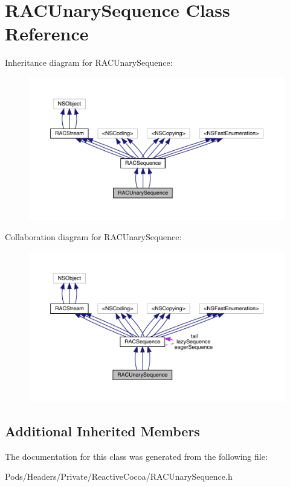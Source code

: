 \hypertarget{interface_r_a_c_unary_sequence}{}\section{R\+A\+C\+Unary\+Sequence Class Reference}
\label{interface_r_a_c_unary_sequence}


Inheritance diagram for R\+A\+C\+Unary\+Sequence\+:\nopagebreak
\begin{figure}[H]
\begin{center}
\leavevmode
\includegraphics[width=350pt]{interface_r_a_c_unary_sequence__inherit__graph}
\end{center}
\end{figure}


Collaboration diagram for R\+A\+C\+Unary\+Sequence\+:\nopagebreak
\begin{figure}[H]
\begin{center}
\leavevmode
\includegraphics[width=350pt]{interface_r_a_c_unary_sequence__coll__graph}
\end{center}
\end{figure}
\subsection*{Additional Inherited Members}


The documentation for this class was generated from the following file\+:\begin{DoxyCompactItemize}
\item 
Pods/\+Headers/\+Private/\+Reactive\+Cocoa/R\+A\+C\+Unary\+Sequence.\+h\end{DoxyCompactItemize}
